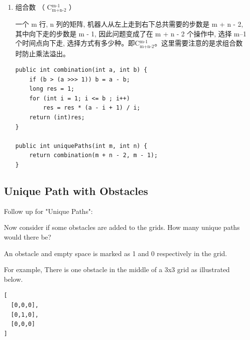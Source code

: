 \documentclass[12pt]{book}
\begin{document}
\begin{enumerate}
\begin{lstlisting}
    int [][] dp = new int[m][n];
    for (int i = 0; i < n; i++) 
        dp[0][i] = 1;
    for (int i = 0; i < m; i++)
        dp[i][0] = 1;
    dp[0][0] = 0;
    for (int i = 1; i < m; i++) 
        for (int j = 1; j < n; j++) 
            dp[i][j] = dp[i][j - 1] + dp[i - 1][j];
    return dp[m-1][n-1];
}
\end{lstlisting}

滚动数组
\lstset{language=java,label= ,caption= ,numbers=none}
\begin{lstlisting}
// 动规,滚动数组
// 时间复杂度 O(n^2), 空间复杂度 O(n)
int uniquePaths(int m, int n) {
    vector<int> f(n, 0);
    f[0] = 1;
    for (int i = 0; i < m; i++) {
        for (int j = 1; j < n; j++) {
            // 左边的 f[j], 表示更新后的 f[j], 与公式中的 f[i[[j] 对应
            // 右边的 f[j], 表示老的 f[j], 与公式中的 f[i-1][j] 对应
            f[j] = f[j - 1] + f[j];
        }
    }
    return f[n - 1];
}
\end{lstlisting}

\item 组合数 （ C$_{\text{m+n-2}}^{\text{m-1}}$ ）
\label{sec-14-2-1-4}

一个 m 行, n 列的矩阵, 机器人从左上走到右下总共需要的步数是 m + n - 2, 其中向下走的步数是 m - 1, 因此问题变成了在 m + n - 2 个操作中, 选择 m–1 个时间点向下走, 选择方式有多少种。即C$_{\text{m+n-2}}^{\text{m-1}}$。这里需要注意的是求组合数时防止乘法溢出。
\lstset{language=java,label= ,caption= ,numbers=none}
\begin{lstlisting}
public int combination(int a, int b) {
    if (b > (a >>> 1)) b = a - b;
    long res = 1;
    for (int i = 1; i <= b ; i++) 
        res = res * (a - i + 1) / i;
    return (int)res;
}

public int uniquePaths(int m, int n) {
    return combination(m + n - 2, m - 1);
}
\end{lstlisting}
\end{enumerate}

\subsection{Unique Path with Obstacles}
\label{sec-14-2-2}
Follow up for "Unique Paths":

Now consider if some obstacles are added to the grids. How many unique paths would there be?

An obstacle and empty space is marked as 1 and 0 respectively in the grid.

For example, There is one obstacle in the middle of a 3x3 grid as illustrated below.
\lstset{language=java,label= ,caption= ,numbers=none}
\begin{lstlisting}
[
  [0,0,0],
  [0,1,0],
  [0,0,0]
]
\end{lstlisting}
\end{document}
